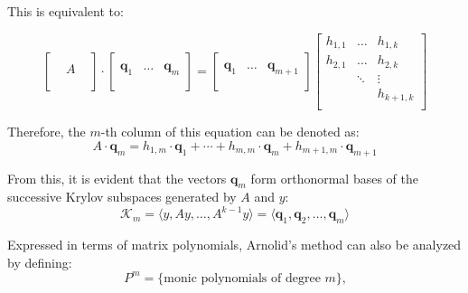 \noindent This is equivalent to:

\begin{equation}
  \left[
    \begin{array}{ccc}
      &  & \\
      & A & \\
      &  & \\
    \end{array}
  \right] \cdot
  \left[
    \begin{array}{c|c|c}
      & & \\
      \bm{q}_1 &\dots & \bm{q}_m \\
      & & \\
    \end{array}
  \right] = 
  \left[
    \begin{array}{c|c|c}
      & & \\
      \bm{q}_1 &\dots & \bm{q}_{m+1} \\
      & & \\
    \end{array}
  \right]
  \left[
    \begin{array}{ccc}
      h_{1,1} & \dots & h_{1,k} \\
      h_{2,1} & \dots &  h_{2,k}\\
      & \ddots & \vdots \\
      & & h_{k+1, k}  \\
    \end{array}
  \right] 
\end{equation}

\noindent Therefore, the $m$-th column of this equation can be denoted as:
\begin{equation}
    A \cdot \bm{q}_m = h_{1,m}\cdot \bm{q}_1+ \cdots + h_{m,m}\cdot \bm{q}_m + h_{m+1,m}\cdot \bm{q}_{m+1}
\end{equation}

\noindent From this, it is evident that the vectors $\bm{q}_m$ form orthonormal bases of the successive Krylov subspaces generated by $A$ and $y$:
\begin{equation}
\label{eqn:krylov_space}
    \mathcal{K}_m=\langle y, Ay, \dots , A^{k-1}y\rangle = \langle \bm{q}_1,\bm{q}_2, \dots , \bm{q}_m\rangle
\end{equation}

\noindent Expressed in terms of matrix polynomials, Arnolid's method can also be analyzed by defining:
\begin{equation}
\label{eqn:arnoldi_poly}
    P^m = \{\text{monic polynomials of degree }m\}\text{,}
\end{equation}

